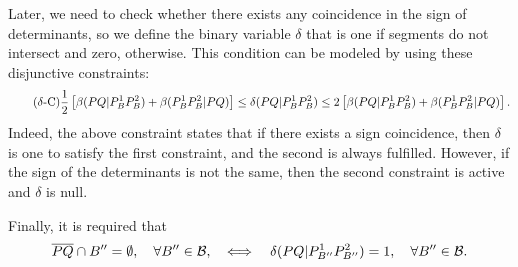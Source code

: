 \documentclass[a4paper]{elsarticle}
\newcommand{\B}{{\mathcal B}}
\newcommand{\ES}{{E^{}_{S}}}
\begin{document}
	Later, we need to check whether there exists any coincidence in the sign of determinants, so we define the binary variable $\delta$ that is one if segments do not intersect and zero, otherwise. This condition can be modeled by using these disjunctive constraints:
	\begin{equation*}\tag{$\delta$-C}\label{eq:deltaC}
		\frac{1}{2}\left[\beta(PQ|P_B^1P_B^2)+\beta(P_B^1P_B^2|PQ)\right]\leq\delta(PQ|P_B^1P_B^2)\leq 2\left[\beta(PQ|P_B^1P_B^2)+\beta(P_B^1P_B^2|PQ)\right].
	\end{equation*}
	Indeed, the above constraint states that if there exists a sign coincidence, then $\delta$ is one to satisfy the first constraint, and the second is always fulfilled. However, if the sign of the determinants is not the same, then the second constraint is active and $\delta$ is null.
	
	Finally, it is required that
	$$\overline{PQ}\cap B''=\emptyset,\quad \forall B''\in\B,\quad\Longleftrightarrow\quad \deltacheck{P}{Q}{P_{B''}^1}{P_{B''}^2}=1,\quad\forall B''\in\B.$$
	
	
	\newcommand{\varepsilonvar}[2]{\varepsilon(#1#2)}
\end{document}
